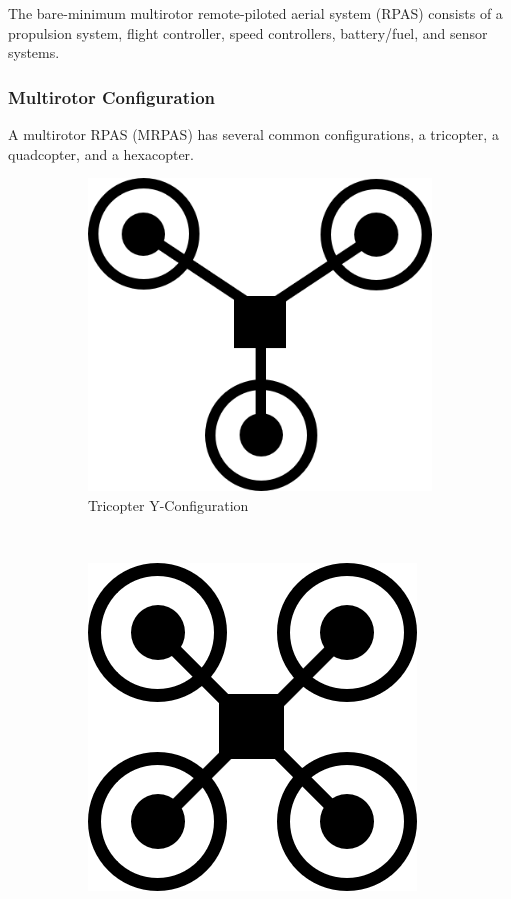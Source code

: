 The bare-minimum multirotor remote-piloted aerial system (RPAS) consists of a propulsion system, flight controller, speed controllers, battery/fuel, and sensor systems.

\subsubsection{Multirotor Configuration}

A multirotor RPAS (MRPAS) has several common configurations, a tricopter, a quadcopter, and a hexacopter.

\begin{figure}[H]
    \centering
    \begin{subfigure}[b]{0.3\textwidth}
        \centering
        \includegraphics[scale=0.4]{img/drone_yconfig}
        \caption{Tricopter Y-Configuration}
        \label{fig:tricopter-y}
    \end{subfigure}
    ~
    \begin{subfigure}[b]{0.3\textwidth}
        \centering
        \includegraphics[scale=0.4]{img/drone_xconfig}

\end{subfigure}
\end{figure}
